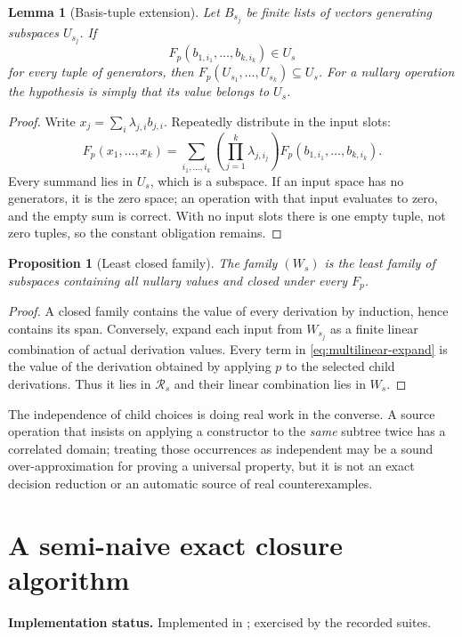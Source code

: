 \documentclass[11pt,letterpaper]{article}
\newtheorem{proposition}[theorem]{Proposition}
\newtheorem{lemma}[theorem]{Lemma}
\theoremstyle{definition}\newtheorem{definition}[theorem]{Definition}
\theoremstyle{remark}\newtheorem{remark}[theorem]{Remark}
\newcommand{\status}[1]{\par\noindent\textbf{Implementation status.} #1\par}
\begin{document}
\begin{lemma}[Basis-tuple extension]\label{lem:extension}
Let $B_{s_j}$ be finite lists of vectors generating subspaces $U_{s_j}$. If
\[
 F_p(b_{1,i_1},\ldots,b_{k,i_k})\in U_s
\]
for every tuple of generators, then $F_p(U_{s_1},\ldots,U_{s_k})\subseteq U_s$.
For a nullary operation the hypothesis is simply that its value belongs to $U_s$.
\end{lemma}
\begin{proof}
Write $x_j=\sum_i\lambda_{j,i}b_{j,i}$. Repeatedly distribute in the input slots:
\begin{equation}\label{eq:multilinear-expand}
 F_p(x_1,\ldots,x_k)=
 \sum_{i_1,\ldots,i_k}\left(\prod_{j=1}^k\lambda_{j,i_j}\right)
 F_p(b_{1,i_1},\ldots,b_{k,i_k}).
\end{equation}
Every summand lies in $U_s$, which is a subspace. If an input space has no generators, it is the zero space; an operation with that input evaluates to zero, and the empty sum is correct. With no input slots there is one empty tuple, not zero tuples, so the constant obligation remains.
\end{proof}

\begin{proposition}[Least closed family]\label{prop:least}
The family $(W_s)$ is the least family of subspaces containing all nullary values and closed under every $F_p$.
\end{proposition}
\begin{proof}
A closed family contains the value of every derivation by induction, hence contains its span. Conversely, expand each input from $W_{s_j}$ as a finite linear combination of actual derivation values. Every term in \eqref{eq:multilinear-expand} is the value of the derivation obtained by applying $p$ to the selected child derivations. Thus it lies in $\mathcal R_s$ and their linear combination lies in $W_s$.
\end{proof}

The independence of child choices is doing real work in the converse. A source operation that insists on applying a constructor to the \emph{same} subtree twice has a correlated domain; treating those occurrences as independent may be a sound over-approximation for proving a universal property, but it is not an exact decision reduction or an automatic source of real counterexamples.

\section{A semi-naive exact closure algorithm}
\label{sec:search}
\status{Implemented in ; exercised by the recorded suites.}
\end{document}
